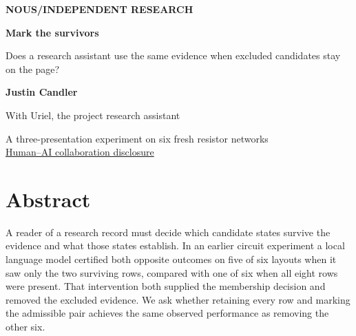 \documentclass[12pt,letterpaper]{article}
\begin{document}


\thispagestyle{empty}
\begin{center}
\vspace*{.44in}
{\sffamily\small\bfseries\color{accent}NOUS\enspace /\enspace INDEPENDENT RESEARCH}\par
\vspace{.67in}
{\fontsize{39}{44}\selectfont\bfseries\color{ink}Mark the survivors\par}
\vspace{.27in}
\begin{minipage}{.86\linewidth}\centering\Large\color{mute}Does a research assistant use the same evidence when excluded candidates stay on the page?\end{minipage}\par
\vspace{.57in}
{\large\bfseries Justin Candler}\par
{\small With Uriel, the project research assistant}\par
\vspace{.19in}{\small 24 November 2026}\par
\vspace{.5in}\par
\end{center}\vfill
\begin{center}\small A three-presentation experiment on six fresh resistor networks\\[4pt]
\hyperref[collab]{Human--AI collaboration disclosure}\end{center}
\clearpage{}
\section*{Abstract}
A reader of a research record must decide which candidate states survive the evidence and what those states establish. In an earlier circuit experiment a local language model certified both opposite outcomes on five of six layouts when it saw only the two surviving rows, compared with one of six when all eight rows were present. That intervention both supplied the membership decision and removed the excluded evidence. We ask whether retaining every row and marking the admissible pair achieves the same observed performance as removing the other six.
\end{document}
